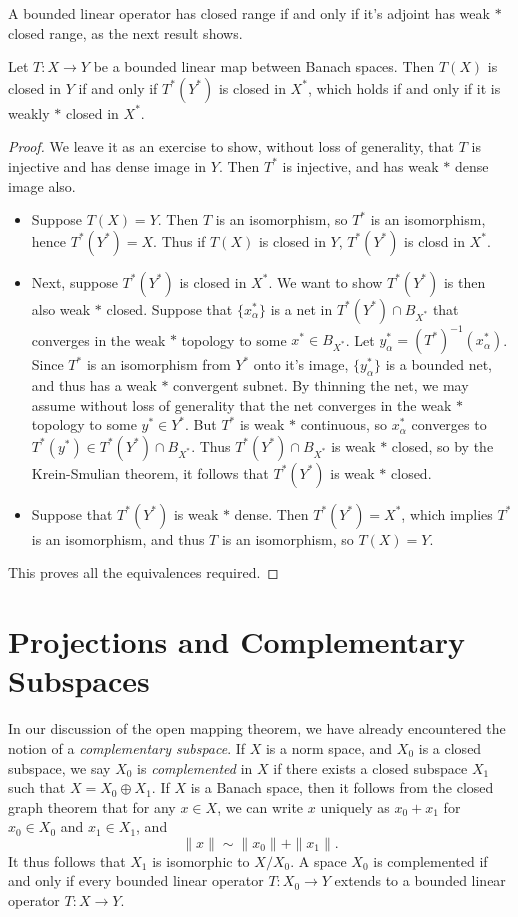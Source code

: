 A bounded linear operator has closed range if and only if it's adjoint has weak $*$ closed range, as the next result shows.

\begin{theorem}
    Let $T: X \to Y$ be a bounded linear map between Banach spaces. Then $T(X)$ is closed in $Y$ if and only if $T^*(Y^*)$ is closed in $X^*$, which holds if and only if it is weakly $*$ closed in $X^*$.
\end{theorem}
\begin{proof}
    We leave it as an exercise to show, without loss of generality, that $T$ is injective and has dense image in $Y$. Then $T^*$ is injective, and has weak $*$ dense image also.
    \begin{itemize}
        \item Suppose $T(X) = Y$. Then $T$ is an isomorphism, so $T^*$ is an isomorphism, hence $T^*(Y^*) = X$. Thus if $T(X)$ is closed in $Y$, $T^*(Y^*)$ is closd in $X^*$.
        \item Next, suppose $T^*(Y^*)$ is closed in $X^*$. We want to show $T^*(Y^*)$ is then also weak $*$ closed. Suppose that $\{ x_\alpha^* \}$ is a net in $T^*(Y^*) \cap B_{X^*}$ that converges in the weak $*$ topology to some $x^* \in B_{X^*}$. Let $y^*_\alpha = (T^*)^{-1}(x_\alpha^*)$. Since $T^*$ is an isomorphism from $Y^*$ onto it's image, $\{ y^*_\alpha \}$ is a bounded net, and thus has a weak $*$ convergent subnet. By thinning the net, we may assume without loss of generality that the net converges in the weak $*$ topology to some $y^* \in Y^*$. But $T^*$ is weak $*$ continuous, so $x^*_\alpha$ converges to $T^*(y^*) \in T^*(Y^*) \cap B_{X^*}$. Thus $T^*(Y^*) \cap B_{X^*}$ is weak $*$ closed, so by the Krein-Smulian theorem, it follows that $T^*(Y^*)$ is weak $*$ closed.

        \item Suppose that $T^*(Y^*)$ is weak $*$ dense. Then $T^*(Y^*) = X^*$, which implies $T^*$ is an isomorphism, and thus $T$ is an isomorphism, so $T(X) = Y$.
    \end{itemize}
    This proves all the equivalences required.
\end{proof}




\section{Projections and Complementary Subspaces}

In our discussion of the open mapping theorem, we have already encountered the notion of a \emph{complementary subspace}. If $X$ is a norm space, and $X_0$ is a closed subspace, we say $X_0$ is \emph{complemented} in $X$ if there exists a closed subspace $X_1$ such that $X = X_0 \oplus X_1$. If $X$ is a Banach space, then it follows from the closed graph theorem that for any $x \in X$, we can write $x$ uniquely as $x_0 + x_1$ for $x_0 \in X_0$ and $x_1 \in X_1$, and
%
\[ \| x \| \sim \| x_0 \| + \| x_1 \|. \]
%
It thus follows that $X_1$ is isomorphic to $X/X_0$. A space $X_0$ is complemented if and only if every bounded linear operator $T:X_0 \to Y$ extends to a bounded linear operator $T: X \to Y$.

